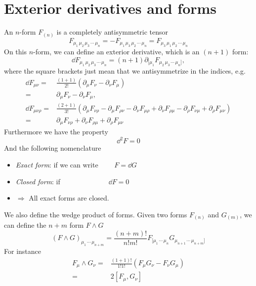 \documentclass[a4paper,12pt]{article}
\begin{document}
\section{Exterior derivatives and forms}
An $n$-form $F_{(n)}$ is a completely antisymmetric tensor 
\begin{equation}
F_{\mu_1\,\mu_2\,\mu_3\,\cdots\,\mu_n}=-F_{\mu_1\,\mu_3\,\mu_2\,\cdots\,\mu_n}=F_{\mu_3\,\mu_1\,\mu_2\,\cdots\,\mu_n}
\end{equation}
On this $n$-form, we can define an exterior derivative, which is an $(n+1)$ form:
\begin{equation}
\dd F_{\mu_1\,\mu_2\,\mu_3\,\cdots\,\mu_n}=(n+1)\partial_{[\mu_1}F_{\mu_2\,\mu_3\,\cdots\,\mu_n]},
\end{equation}
where the square brackets just mean that we antisymmetrize in the indices, e.g.
\begin{equation}
\begin{aligned}
\dd F_{\mu\nu}=&\frac{(1+1)}{2!}\left(\partial_\mu F_\nu-\partial_\nu F_\mu\right)\\
=&\partial_\mu F_\nu-\partial_\nu F_\mu,\\ \dd F_{\mu\nu\rho}=&\frac{(2+1)}{3!}\left(\partial_\mu F_{\nu\rho}-\partial_\mu F_{\rho\nu}-\partial_\nu F_{\mu\rho}+\partial_\nu F_{\rho\mu}-\partial_\rho F_{\nu\mu}+\partial_\rho F_{\mu\nu}\right)\\
=&\partial_\mu F_{\nu\rho}+\partial_\nu F_{\rho\mu}+\partial_\rho F_{\mu\nu}
\end{aligned}
\end{equation}
Furthermore we have the property
\begin{equation}
\dd^2 F=0
\end{equation}
And the following nomenclature
\begin{itemize}
\item \textit{Exact form}: if we can write $\qquad F=\dd G$
\item \textit{Closed form}: if $\qquad \qquad \qquad ~~~ \dd F=0$
\item $\Rightarrow$ All exact forms are closed.
\end{itemize}
We also define the wedge product of forms. Given two forms $F_{(n)}$ and $G_{(m)}$, we can define the $n+m$ form $F\wedge G$
\begin{equation}
(F\wedge G)_{\mu_1\,\cdots\,\mu_{n+m}}=\frac{(n+m)!}{n!m!}F_{[\mu_1\,\cdots\,\mu_n}G_{\mu_{n+1}\,\cdots\,\mu_{n+m}]}
\end{equation}
For instance
\begin{equation}
\begin{aligned}
F_\mu\wedge G_\nu=&\frac{(1+1)!}{1!1!}\left(F_\mu G_\nu-F_\nu G_\mu\right)\\
=&2[F_\mu,G_\nu]
\end{aligned}
\end{equation}
\end{document}
